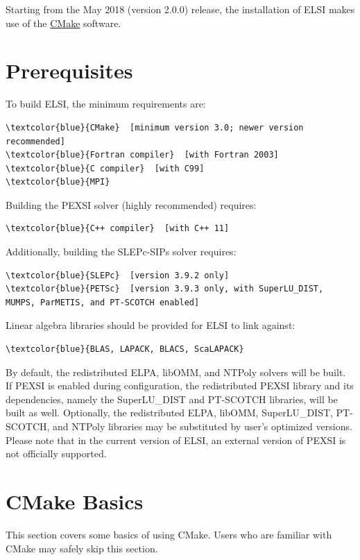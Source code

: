 \documentclass{report}
\begin{document}
Starting from the May 2018 (version 2.0.0) release, the installation of ELSI makes use of the \href{http://cmake.org}{CMake} software.\\

\section{Prerequisites}
\label{sec:prereq}
To build ELSI, the minimum requirements are:
\begin{Verbatim}[commandchars=\\\{\}]
\textcolor{blue}{CMake}  [minimum version 3.0; newer version recommended]
\textcolor{blue}{Fortran compiler}  [with Fortran 2003]
\textcolor{blue}{C compiler}  [with C99]
\textcolor{blue}{MPI}
\end{Verbatim}

Building the PEXSI solver (highly recommended) requires:
\begin{Verbatim}[commandchars=\\\{\}]
\textcolor{blue}{C++ compiler}  [with C++ 11]
\end{Verbatim}

Additionally, building the SLEPc-SIPs solver requires:
\begin{Verbatim}[commandchars=\\\{\}]
\textcolor{blue}{SLEPc}  [version 3.9.2 only]
\textcolor{blue}{PETSc}  [version 3.9.3 only, with SuperLU_DIST, MUMPS, ParMETIS, and PT-SCOTCH enabled]
\end{Verbatim}

Linear algebra libraries should be provided for ELSI to link against:
\begin{Verbatim}[commandchars=\\\{\}]
\textcolor{blue}{BLAS, LAPACK, BLACS, ScaLAPACK}
\end{Verbatim}

By default, the redistributed ELPA, libOMM, and NTPoly solvers will be built.  If PEXSI is enabled during configuration, the redistributed PEXSI library and its dependencies, namely the SuperLU\_DIST and PT-SCOTCH libraries, will be built as well.  Optionally, the redistributed ELPA, libOMM, SuperLU\_DIST, PT-SCOTCH, and NTPoly libraries may be substituted by user's optimized versions.  Please note that in the current version of ELSI, an external version of PEXSI is not officially supported.\\

\section{CMake Basics}
\label{sec:cmake}
This section covers some basics of using CMake.  Users who are familiar with CMake may safely skip this section.\\
\end{document}
